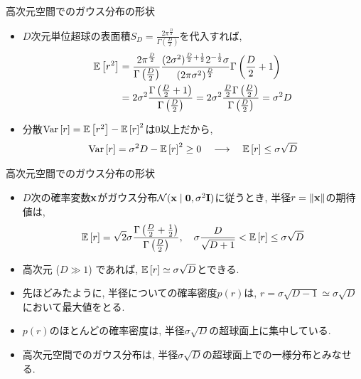 \documentclass[dvipdfmx,notheorems,t]{beamer}
\begin{document}
\begin{frame}{高次元空間でのガウス分布の形状}
\begin{itemize}
  \item $D$次元単位超球の表面積$S_D = \frac{2 \pi^\frac{D}{2}}{\Gamma \left( \frac{D}{2} \right)}$を代入すれば,
  \begin{align*}
    \operatorname{\mathbb{E}} \left[ r^2 \right] &= \frac{2 \pi^\frac{D}{2}}{\Gamma \left( \frac{D}{2} \right)}
      \frac{(2\sigma^2)^{\frac{D}{2} + \frac{1}{2}} 2^{-\frac{1}{2}} \sigma}{(2\pi \sigma^2)^\frac{D}{2}}
      \Gamma \left( \frac{D}{2} + 1 \right) \\
      &= 2\sigma^2 \frac{\Gamma \left( \frac{D}{2} + 1 \right)}{\Gamma \left( \frac{D}{2} \right)}
      = 2\sigma^2 \frac{\frac{D}{2} \Gamma \left( \frac{D}{2} \right)}{\Gamma \left( \frac{D}{2} \right)}
      = \sigma^2 D
  \end{align*}

  \item 分散$\operatorname{Var} \left[ r \right] = \operatorname{\mathbb{E}} \left[ r^2 \right] - \operatorname{\mathbb{E}} \left[ r \right]^2$は0以上だから,
  \begin{align*}
    \operatorname{Var} \left[ r \right] = \sigma^2 D - \operatorname{\mathbb{E}} \left[ r \right]^2 \ge 0 \quad \longrightarrow \quad
    \operatorname{\mathbb{E}} \left[ r \right] \le \sigma \sqrt{D}
  \end{align*}
\end{itemize}
\end{frame}

\begin{frame}{高次元空間でのガウス分布の形状}
\begin{itemize}
  \item $D$次の確率変数$\vb{x}$がガウス分布$\mathcal{N}(\vb{x} \mid \vb{0}, \sigma^2 \vb{I})$に従うとき,
  半径$r = \left\| \vb{x} \right\|$の期待値は,
  \begin{align*}
    \operatorname{\mathbb{E}} \left[ r \right] = \sqrt{2} \sigma \frac{\Gamma \left( \frac{D}{2} + \frac{1}{2} \right)}{\Gamma \left( \frac{D}{2} \right)}, \quad
    \sigma \frac{D}{\sqrt{D + 1}} < \operatorname{\mathbb{E}} \left[ r \right] \le \sigma \sqrt{D}
  \end{align*}

  \item 高次元 ($D \gg 1$) であれば, $\operatorname{\mathbb{E}} \left[ r \right] \simeq \sigma \sqrt{D}$とできる.
  \item 先ほどみたように, 半径についての確率密度$p(r)$は, $r = \sigma \sqrt{D - 1} \simeq \sigma \sqrt{D}$において最大値をとる.
  \item $p(r)$のほとんどの確率密度は, 半径$\sigma \sqrt{D}$の超球面上に集中している. \newline
  \item 高次元空間でのガウス分布は, 半径$\sigma \sqrt{D}$の超球面上での一様分布とみなせる.
\end{itemize}
\end{frame}
\end{document}
